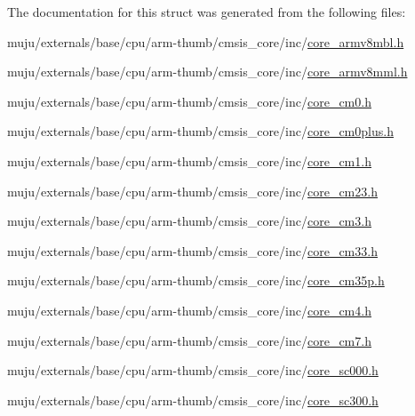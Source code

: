 The documentation for this struct was generated from the following files\+:\begin{DoxyCompactItemize}
\item 
muju/externals/base/cpu/arm-\/thumb/cmsis\+\_\+core/inc/\hyperlink{core__armv8mbl_8h}{core\+\_\+armv8mbl.\+h}\item 
muju/externals/base/cpu/arm-\/thumb/cmsis\+\_\+core/inc/\hyperlink{core__armv8mml_8h}{core\+\_\+armv8mml.\+h}\item 
muju/externals/base/cpu/arm-\/thumb/cmsis\+\_\+core/inc/\hyperlink{core__cm0_8h}{core\+\_\+cm0.\+h}\item 
muju/externals/base/cpu/arm-\/thumb/cmsis\+\_\+core/inc/\hyperlink{core__cm0plus_8h}{core\+\_\+cm0plus.\+h}\item 
muju/externals/base/cpu/arm-\/thumb/cmsis\+\_\+core/inc/\hyperlink{core__cm1_8h}{core\+\_\+cm1.\+h}\item 
muju/externals/base/cpu/arm-\/thumb/cmsis\+\_\+core/inc/\hyperlink{core__cm23_8h}{core\+\_\+cm23.\+h}\item 
muju/externals/base/cpu/arm-\/thumb/cmsis\+\_\+core/inc/\hyperlink{core__cm3_8h}{core\+\_\+cm3.\+h}\item 
muju/externals/base/cpu/arm-\/thumb/cmsis\+\_\+core/inc/\hyperlink{core__cm33_8h}{core\+\_\+cm33.\+h}\item 
muju/externals/base/cpu/arm-\/thumb/cmsis\+\_\+core/inc/\hyperlink{core__cm35p_8h}{core\+\_\+cm35p.\+h}\item 
muju/externals/base/cpu/arm-\/thumb/cmsis\+\_\+core/inc/\hyperlink{core__cm4_8h}{core\+\_\+cm4.\+h}\item 
muju/externals/base/cpu/arm-\/thumb/cmsis\+\_\+core/inc/\hyperlink{core__cm7_8h}{core\+\_\+cm7.\+h}\item 
muju/externals/base/cpu/arm-\/thumb/cmsis\+\_\+core/inc/\hyperlink{core__sc000_8h}{core\+\_\+sc000.\+h}\item 
muju/externals/base/cpu/arm-\/thumb/cmsis\+\_\+core/inc/\hyperlink{core__sc300_8h}{core\+\_\+sc300.\+h}\end{DoxyCompactItemize}
